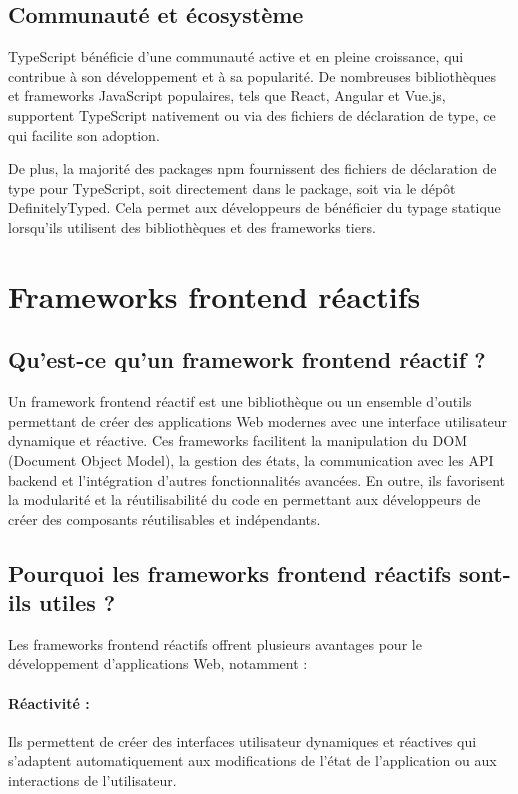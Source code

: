 \subsection{Communauté et écosystème}

TypeScript bénéficie d'une communauté active et en pleine croissance, qui contribue à son développement et à sa popularité. De nombreuses bibliothèques et frameworks JavaScript populaires, tels que React, Angular et Vue.js, supportent TypeScript nativement ou via des fichiers de déclaration de type, ce qui facilite son adoption.

De plus, la majorité des packages npm fournissent des fichiers de déclaration de type pour TypeScript, soit directement dans le package, soit via le dépôt DefinitelyTyped. Cela permet aux développeurs de bénéficier du typage statique lorsqu'ils utilisent des bibliothèques et des frameworks tiers.

\section{Frameworks frontend réactifs}

\subsection{Qu'est-ce qu'un framework frontend réactif ?}

Un framework frontend réactif est une bibliothèque ou un ensemble d'outils permettant de créer des applications Web modernes avec une interface utilisateur dynamique et réactive. Ces frameworks facilitent la manipulation du DOM (Document Object Model), la gestion des états, la communication avec les API backend et l'intégration d'autres fonctionnalités avancées. En outre, ils favorisent la modularité et la réutilisabilité du code en permettant aux développeurs de créer des composants réutilisables et indépendants.

\subsection{Pourquoi les frameworks frontend réactifs sont-ils utiles ?}

Les frameworks frontend réactifs offrent plusieurs avantages pour le développement d'applications Web, notamment :

\paragraph{Réactivité :} Ils permettent de créer des interfaces utilisateur dynamiques et réactives qui s'adaptent automatiquement aux modifications de l'état de l'application ou aux interactions de l'utilisateur.
